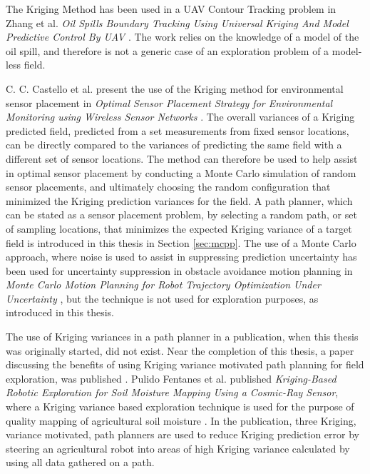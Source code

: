 The Kriging Method has been used in a UAV Contour Tracking problem in Zhang et al. \textit{Oil Spills Boundary Tracking Using Universal Kriging And Model Predictive Control By UAV} \cite{zhang:oil_krig}. The work relies on the knowledge of a model of the oil spill, and therefore is not a generic case of an exploration problem of a model-less field.

C. C. Castello et al. present the use of the Kriging method for environmental sensor placement in \textit{Optimal Sensor Placement Strategy for Environmental Monitoring using Wireless Sensor Networks} \cite{kriging:sensorplacement}. The overall variances of a Kriging predicted field, predicted from a set measurements from fixed sensor locations, can be directly compared to the variances of predicting the same field with a different set of sensor locations. The method can therefore be used to help assist in optimal sensor placement by conducting a Monte Carlo simulation of random sensor placements, and ultimately choosing the random configuration that minimized the Kriging prediction variances for the field. A path planner, which can be stated as a sensor placement problem, by selecting a random path, or set of sampling locations, that minimizes the expected Kriging variance of a target field is introduced in this thesis in Section \ref{sec:mcpp}. The use of a Monte Carlo approach, where noise is used to assist in suppressing prediction uncertainty has been used for uncertainty suppression in obstacle avoidance motion planning in \textit{Monte Carlo Motion Planning for Robot Trajectory Optimization Under Uncertainty} \cite{janson:mcmp}, but the technique is not used for exploration purposes, as introduced in this thesis.

The use of Kriging variances in a path planner in a publication, when this thesis was originally started, did not exist. Near the completion of this thesis, a paper discussing the benefits of using Kriging variance motivated path planning for field exploration, was published \cite{fentanes:soilkrig}. Pulido Fentanes et al. published \textit{Kriging-Based Robotic Exploration for Soil Moisture Mapping Using a Cosmic-Ray Sensor}, where a Kriging variance based exploration technique is used for the purpose of quality mapping of agricultural soil moisture \cite{fentanes:soilkrig}. In the publication, three Kriging, variance motivated, path planners are used to reduce Kriging prediction error by steering an agricultural robot into areas of high Kriging variance calculated by using all data gathered on a path. 

